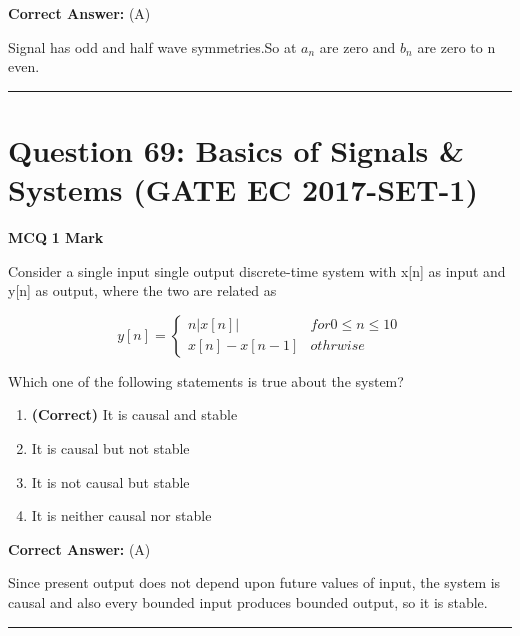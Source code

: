 \documentclass[11pt,a4paper]{article}
\begin{document}
\noindent \textbf{Correct Answer:} (A)

\begin{tcolorbox}[solbox, title=Detailed Solution -- Question 68]
Signal has odd and half wave symmetries.So at $a_{n}$ are zero and $b_{n}$ are zero to n even.
\end{tcolorbox}

\vspace{1.5em}
\hrule
\vspace{1.5em}

\section*{Question 69: Basics of Signals \& Systems (GATE EC 2017-SET-1)}
\noindent \textbf{\color{primary}MCQ} \hfill \textbf{\color{secondary}1 Mark}


\noindent Consider a single input single output discrete-time system with x[n] as input and y[n] as output, where the two are related as 

\[
y[n]=\left\{\begin{matrix} n|x[n]| & for 0\leq n\leq 10\\ x[n]-x[n-1] & othrwise \end{matrix}\right.
\]
 
Which one of the following statements is true about the system?


\begin{enumerate}[label=(\Alph*)]
    \item \textbf{(Correct)} It is causal and stable
    \item It is causal but not stable
    \item It is not causal but stable
    \item It is neither causal nor stable
\end{enumerate}

\noindent \textbf{Correct Answer:} (A)

\begin{tcolorbox}[solbox, title=Detailed Solution -- Question 69]
Since present output does not depend upon future values of input, the system is causal and also every bounded input produces bounded output, so it is stable.
\end{tcolorbox}

\vspace{1.5em}
\hrule
\vspace{1.5em}
\end{document}
